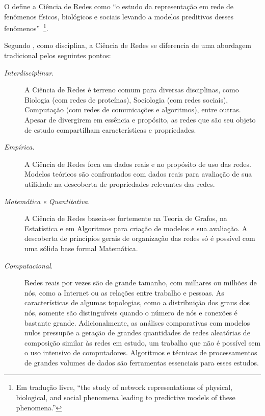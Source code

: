 \documentclass[12pt,a4paper]{article}
\theoremstyle{hypo}
\begin{document}
O  define a Ciência de Redes como \enquote{o estudo da representação em rede de fenômenos físicos, biológicos e sociais levando a modelos preditivos desses fenômenos}~\footnote{Em tradução livre, \enquote{the study of network representations of physical, biological, and social phenomena leading to predictive models of these phenomena.}}.

Segundo , como disciplina, a Ciência de Redes se diferencia de uma abordagem tradicional pelos seguintes pontos:

\begin{description}
	\item[\textit{Interdisciplinar}.] A Ciência de Redes é terreno comum para diversas disciplinas, como Biologia (com redes de proteínas), Sociologia (com redes sociais), Computação (com redes de comunicações e algoritmos), entre outras. Apesar de divergirem em essência e propósito, as redes que são seu objeto de estudo compartilham características e propriedades.
    
    \item[\textit{Empírica}.] A Ciência de Redes foca em dados reais e no propósito de uso das redes. Modelos teóricos são confrontados com dados reais para avaliação de sua utilidade na descoberta de propriedades relevantes das redes.
    
    \item[\textit{Matemática e Quantitativa}.] A Ciência de Redes baseia-se fortemente na Teoria de Grafos, na Estatística e em Algoritmos para criação de modelos e sua avaliação. A descoberta de princípios gerais de organização das redes só é possível com uma sólida base formal Matemática.
    
    \item[\textit{Computacional}.] Redes reais por vezes são de grande tamanho, com milhares ou milhões de nós, como a Internet ou as relações entre trabalho e pessoas. As características de algumas topologias, como a distribuição dos graus dos nós, somente são distinguíveis quando o número de nós e conexões é bastante grande. Adicionalmente, as análises comparativas com modelos nulos pressupõe a geração de grandes quantidades de redes aleatórias de composição similar às redes em estudo, um trabalho que não é possível sem o uso intensivo de computadores. Algoritmos e técnicas de processamentos de grandes volumes de dados são ferramentas essenciais para esses estudos.
\end{description}
\end{document}
